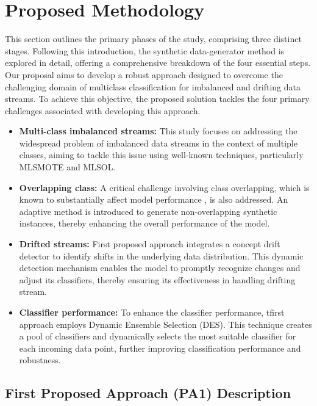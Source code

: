 \section{Proposed Methodology}
\label{sec:4_first_proposed_approach}

This section outlines the primary phases of the study, comprising three distinct stages. Following this introduction, the synthetic data-generator method is explored in detail, offering a comprehensive breakdown of the four essential steps. Our proposal aims to develop a robust approach designed to overcome the challenging domain of multiclass classification for imbalanced and drifting data streams. To achieve this objective, the proposed solution tackles the four primary challenges associated with developing this approach.
\begin{itemize}
	\item \textbf{Multi-class imbalanced streams:} This study focuses on addressing the widespread problem of imbalanced data streams in the context of multiple classes, aiming to tackle this issue using well-known techniques, particularly MLSMOTE and MLSOL.
	\item \textbf{Overlapping class:} A critical challenge involving class overlapping, which is known to substantially affect model performance \cite{cruz2017meta, widmer1996learning}, is also addressed. An adaptive method is introduced to generate non-overlapping synthetic instances, thereby enhancing the overall performance of the model.
	\item \textbf{Drifted streams:} First proposed approach integrates a concept drift detector to identify shifts in the underlying data distribution. This dynamic detection mechanism enables the model to promptly recognize changes and adjust its classifiers, thereby ensuring its effectiveness in handling drifting stream.
	\item \textbf{Classifier performance:} To enhance the classifier performance, tfirst approach employs Dynamic Ensemble Selection (DES). This technique creates a pool of classifiers and dynamically selects the most suitable classifier for each incoming data point, further improving classification performance and robustness.
\end{itemize}

\subsection{First Proposed Approach (PA1) Description}

